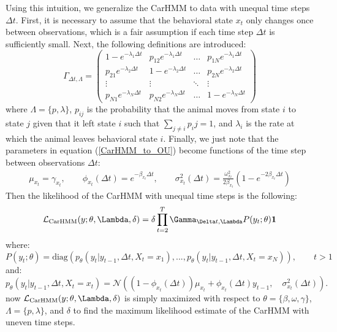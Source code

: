 Using this intuition, we generalize the CarHMM to data with unequal time steps $\Delta t$. First, it is necessary to assume that the behavioral state $x_t$ only changes once between observations, which is a fair assumption if each time step $\Delta t$ is sufficiently small. Next, the following definitions are introduced:
%
$$\Gamma_{\Delta t,\Lambda} = \begin{pmatrix} 
1-e^{-\lambda_1 \Delta t} & p_{12} e^{-\lambda_1 \Delta t} & \dots & p_{1N} e^{-\lambda_1 \Delta t} \\
p_{21} e^{-\lambda_2 \Delta t} & 1-e^{-\lambda_2 \Delta t} & \dots & p_{2N} e^{-\lambda_2 \Delta t} \\
\vdots & \vdots & \ddots & \vdots \\
p_{N1} e^{-\lambda_N \Delta t} & p_{N2} e^{-\lambda_N \Delta t} & \dots  & 1-e^{-\lambda_N \Delta t}
\end{pmatrix}$$
%
where $\Lambda = \{p,\lambda\}$, $p_{ij}$ is the probability that the animal moves from state $i$ to state $j$ given that it left state $i$ such that $\sum_{j \neq i} p_ij = 1$, and $\lambda_i$ is the rate at which the animal leaves behavioral state $i$. Finally, we just note that the parameters in equation (\ref{CarHMM_to_OU}) become functions of the time step between observations $\Delta t$:
%
\begin{align*}
\mu_{x_t}= \gamma_{x_t}, \qquad \phi_{x_t}(\Delta t) = e^{-\beta_{x_t}\Delta t}, \qquad \sigma^2_{x_t}(\Delta t) = \frac{\omega_{x_t}^2}{2\beta_{x_t}} (1-e^{-2\beta_{x_t}\Delta t})
\end{align*}
%
Then the likelihood of the CarHMM with unequal time steps is the following:
%
$$\calL_{\text{CarHMM}}(y;\theta,\Lambda,\delta) = \delta \prod_{t=2}^{T} \Gamma_{\Delta t,\Lambda} P(y_t;\theta) \mathbf{1}$$
%
where:
%
$$P(y_t;\theta) = \text{diag}(p_\theta(y_t|y_{t-1}, \Delta t, X_t = x_1), . . . , p_\theta(y_t|y_{t-1}, \Delta t, X_t = x_N )), \qquad t > 1$$
%
and:
%
$$p_\theta(y_t|y_{t-1}, \Delta t, X_t = x_t) = \mathcal{N}\left((1-\phi_{x_t}(\Delta t))\mu_{x_t} + \phi_{x_t}(\Delta t) y_{t-1},\quad \sigma_{x_t}^2(\Delta t) \right).$$
%
now $\calL_{\text{CarHMM}}(y;\theta,\Lambda,\delta)$ is simply maximized with respect to $\theta = \{\beta,\omega,\gamma\}$, $\Lambda = \{p,\lambda\}$, and $\delta$ to find the maximum likelihood estimate of the CarHMM with uneven time steps.








